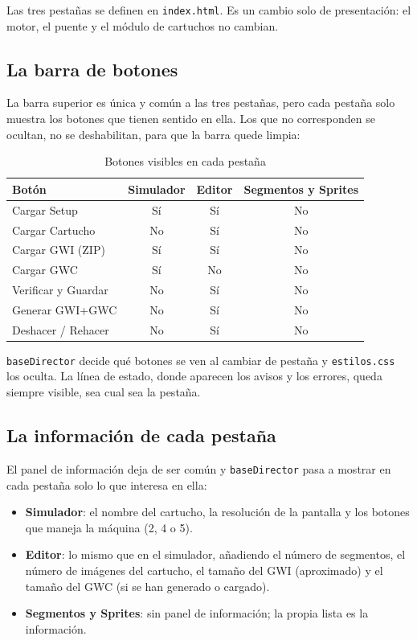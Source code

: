 Las tres pestañas se definen en \texttt{index.html}. Es un cambio
solo de presentación: el motor, el puente y el módulo de cartuchos no
cambian.

\subsection{La barra de botones}
\label{sec:F5I7Botones}

La barra superior es única y común a las tres pestañas, pero cada
pestaña solo muestra los botones que tienen sentido en ella. Los que no
corresponden se ocultan, no se deshabilitan, para que la barra quede
limpia:

\begin{table}[H]
	\centering
	\begin{tabular}{lccc}
		\hline
		\textbf{Botón} & \textbf{Simulador} & \textbf{Editor} & \textbf{Segmentos y Sprites} \\
		\hline
		Cargar Setup        & Sí & Sí & No \\
		Cargar Cartucho\footnotemark & No & Sí & No \\
		Cargar GWI (ZIP)    & Sí & Sí & No \\
		Cargar GWC          & Sí & No & No \\
		Verificar y Guardar & No & Sí & No \\
		Generar GWI+GWC     & No & Sí & No \\
		Deshacer / Rehacer  & No & Sí & No \\
		\hline
	\end{tabular}
	\caption{Botones visibles en cada pestaña}
	\label{tab:F5I7Botones}
\end{table}


\texttt{baseDirector} decide qué botones se ven al cambiar de pestaña
y \texttt{estilos.css} los oculta. La línea de estado, donde aparecen
los avisos y los errores, queda siempre visible, sea cual sea la
pestaña.

\subsection{La información de cada pestaña}
\label{sec:F5I7Informacion}

El panel de información deja de ser común y \texttt{baseDirector} pasa
a mostrar en cada pestaña solo lo que interesa en ella:

\begin{itemize}
	\item \textbf{Simulador}: el nombre del cartucho, la resolución de
	la pantalla y los botones que maneja la máquina (2, 4 o 5).
	
	\item \textbf{Editor}: lo mismo que en el simulador, añadiendo el
	número de segmentos, el número de imágenes del cartucho, el tamaño
	del GWI (aproximado) y el tamaño del GWC (si se han generado o cargado).

	\item \textbf{Segmentos y Sprites}: sin panel de información; la propia lista
	es la información.
\end{itemize}

